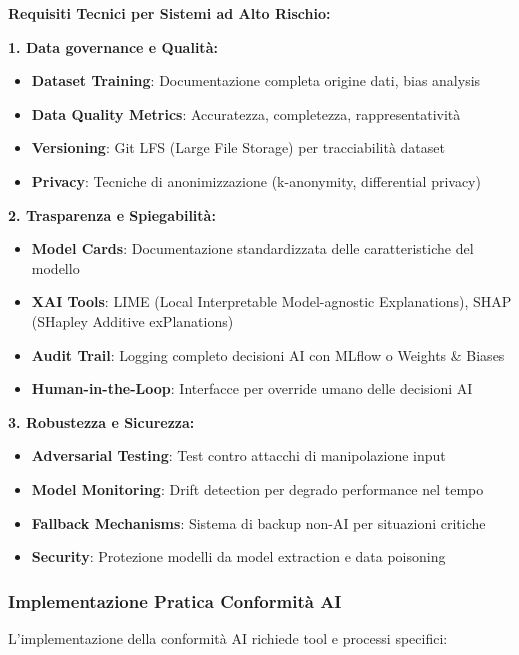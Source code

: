 \textbf{Requisiti Tecnici per Sistemi ad Alto Rischio:}

\textbf{1. Data \gls{governance} e Qualità:}
\begin{itemize}
    \item \textbf{Dataset Training}: Documentazione completa origine dati, bias analysis
    \item \textbf{Data Quality Metrics}: Accuratezza, completezza, rappresentatività
    \item \textbf{Versioning}: Git LFS (Large File Storage) per tracciabilità dataset
    \item \textbf{Privacy}: Tecniche di anonimizzazione (k-anonymity, differential privacy)
\end{itemize}

\textbf{2. Trasparenza e Spiegabilità:}
\begin{itemize}
    \item \textbf{Model Cards}: Documentazione standardizzata delle caratteristiche del modello
    \item \textbf{XAI Tools}: LIME (Local Interpretable Model-agnostic Explanations), SHAP (SHapley Additive exPlanations)
    \item \textbf{Audit Trail}: Logging completo decisioni AI con MLflow o Weights \& Biases
    \item \textbf{Human-in-the-Loop}: Interfacce per override umano delle decisioni AI
\end{itemize}

\textbf{3. Robustezza e Sicurezza:}
\begin{itemize}
    \item \textbf{Adversarial Testing}: Test contro attacchi di manipolazione input
    \item \textbf{Model Monitoring}: Drift detection per degrado performance nel tempo
    \item \textbf{Fallback Mechanisms}: Sistema di backup non-AI per situazioni critiche
    \item \textbf{Security}: Protezione modelli da model extraction e data poisoning
\end{itemize}

\subsubsection{\texorpdfstring{Implementazione Pratica Conformità AI}{4.8.1.2 - Implementazione Pratica Conformità AI}}

L'implementazione della conformità AI richiede tool e processi specifici:

